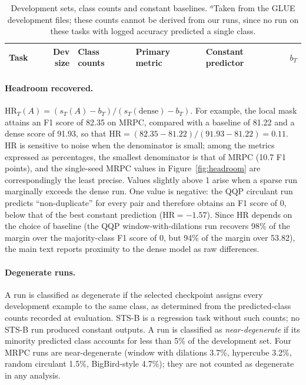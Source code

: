 \documentclass[10pt]{article}
\newcommand{\HR}{\mathrm{HR}}
\begin{document}
\begin{table}[H]
\centering
\caption{Development sets, class counts and constant baselines. $^a$Taken from the GLUE development files; these counts cannot be derived from our runs, since no run on these tasks with logged accuracy predicted a single class.}
\label{tab:baselines}
\scriptsize
\setlength{\tabcolsep}{4pt}
\begin{tabular}{lrllll}
\toprule
Task & Dev size & Class counts & Primary metric & Constant predictor & $b_T$ \\
\midrule

\end{tabular}
\end{table}

\paragraph{Headroom recovered.} $\HR_T(A)=(s_T(A)-b_T)/(s_T(\text{dense})-b_T)$. For example, the local mask attains an F1 score of 82.35 on MRPC, compared with a baseline of 81.22 and a dense score of 91.93, so that $\HR=(82.35-81.22)/(91.93-81.22)=0.11$. $\HR$ is sensitive to noise when the denominator is small; among the metrics expressed as percentages, the smallest denominator is that of MRPC (10.7 F1 points), and the single-seed MRPC values in Figure~\ref{fig:headroom} are correspondingly the least precise. Values slightly above 1 arise when a sparse run marginally exceeds the dense run. One value is negative: the QQP circulant run predicts ``non-duplicate'' for every pair and therefore obtains an F1 score of 0, below that of the best constant prediction ($\HR=-1.57$). Since $\HR$ depends on the choice of baseline (the QQP window-with-dilations run recovers 98\% of the margin over the majority-class F1 score of 0, but 94\% of the margin over 53.82), the main text reports proximity to the dense model as raw differences.

\paragraph{Degenerate runs.} A run is classified as degenerate if the selected checkpoint assigns every development example to the same class, as determined from the predicted-class counts recorded at evaluation. STS-B is a regression task without such counts; no STS-B run produced constant outputs. A run is classified as \emph{near-degenerate} if its minority predicted class accounts for less than 5\% of the development set. Four MRPC runs are near-degenerate (window with dilations 3.7\%, hypercube 3.2\%, random circulant 1.5\%, BigBird-style 4.7\%); they are not counted as degenerate in any analysis.
\end{document}
